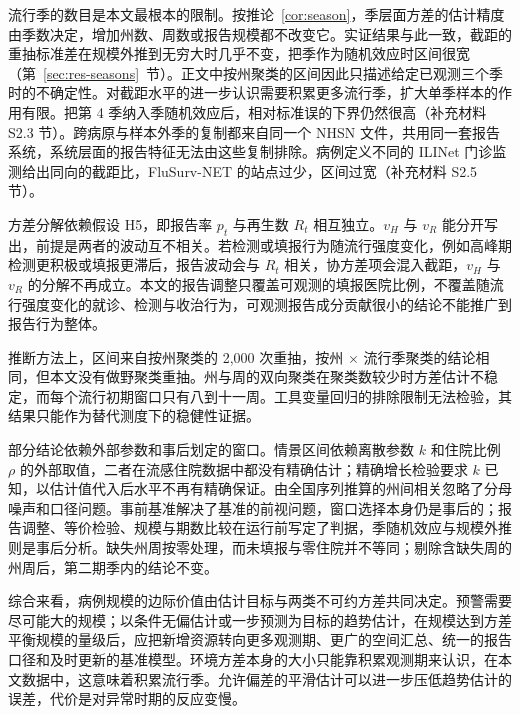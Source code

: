 流行季的数目是本文最根本的限制。按推论~\ref{cor:season}，季层面方差的估计精度由季数决定，增加州数、周数或报告规模都不改变它。实证结果与此一致，截距的重抽标准差在规模外推到无穷大时几乎不变，把季作为随机效应时区间很宽（第~\ref{sec:res-seasons}~节）。正文中按州聚类的区间因此只描述给定已观测三个季时的不确定性。对截距水平的进一步认识需要积累更多流行季，扩大单季样本的作用有限。把第 4 季纳入季随机效应后，相对标准误的下界仍然很高（补充材料 S2.3 节）。跨病原与样本外季的复制都来自同一个 NHSN 文件，共用同一套报告系统，系统层面的报告特征无法由这些复制排除。病例定义不同的 ILINet 门诊监测给出同向的截距比，FluSurv-NET 的站点过少，区间过宽（补充材料 S2.5 节）。

方差分解依赖假设 H5，即报告率 $p_t$ 与再生数 $R_t$ 相互独立。$v_H$ 与 $v_R$ 能分开写出，前提是两者的波动互不相关。若检测或填报行为随流行强度变化，例如高峰期检测更积极或填报更滞后，报告波动会与 $R_t$ 相关，协方差项会混入截距，$v_H$ 与 $v_R$ 的分解不再成立。本文的报告调整只覆盖可观测的填报医院比例，不覆盖随流行强度变化的就诊、检测与收治行为，可观测报告成分贡献很小的结论不能推广到报告行为整体。

推断方法上，区间来自按州聚类的 2,000 次重抽，按州 $\times$ 流行季聚类的结论相同，但本文没有做野聚类重抽。州与周的双向聚类在聚类数较少时方差估计不稳定\citep{cameron2011robust, cameron2015practitioner}，而每个流行初期窗口只有八到十一周。工具变量回归的排除限制无法检验，其结果只能作为替代测度下的稳健性证据。

部分结论依赖外部参数和事后划定的窗口。情景区间依赖离散参数 $k$ 和住院比例 $\rho$ 的外部取值，二者在流感住院数据中都没有精确估计；精确增长检验要求 $k$ 已知，以估计值代入后水平不再有精确保证。由全国序列推算的州间相关忽略了分母噪声和口径问题。事前基准解决了基准的前视问题，窗口选择本身仍是事后的；报告调整、等价检验、规模与期数比较在运行前写定了判据，季随机效应与规模外推则是事后分析。缺失州周按零处理，而未填报与零住院并不等同；剔除含缺失周的州周后，第二期季内的结论不变。

综合来看，病例规模的边际价值由估计目标与两类不可约方差共同决定。预警需要尽可能大的规模；以条件无偏估计或一步预测为目标的趋势估计，在规模达到方差平衡规模的量级后，应把新增资源转向更多观测期、更广的空间汇总、统一的报告口径和及时更新的基准模型。环境方差本身的大小只能靠积累观测期来认识，在本文数据中，这意味着积累流行季。允许偏差的平滑估计可以进一步压低趋势估计的误差，代价是对异常时期的反应变慢。
